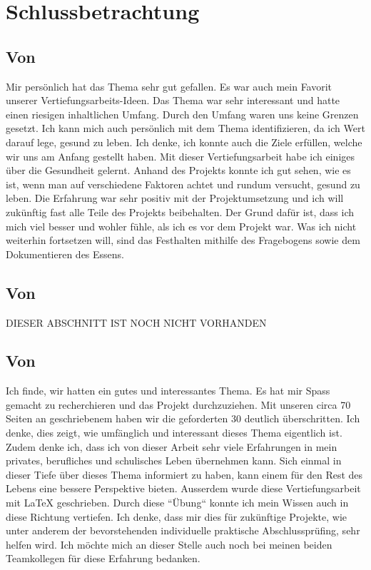 \chapter{Schlussbetrachtung}
\section{Von \bastian}
\authortoc{\bastian}{\sectionident}
Mir persönlich hat das Thema sehr gut gefallen. Es war auch mein Favorit unserer Vertiefungsarbeits-Ideen. Das Thema war sehr interessant und hatte einen riesigen inhaltlichen Umfang. Durch den Umfang waren uns keine Grenzen gesetzt. Ich kann mich auch persönlich mit dem Thema identifizieren, da ich Wert darauf lege, gesund zu leben. Ich denke, ich konnte auch die Ziele erfüllen, welche wir uns am Anfang gestellt haben. Mit dieser Vertiefungsarbeit habe ich einiges über die Gesundheit gelernt. Anhand des Projekts konnte ich gut sehen, wie es ist, wenn man auf verschiedene Faktoren achtet und rundum versucht, gesund zu leben. Die Erfahrung war sehr positiv mit der Projektumsetzung und ich will zukünftig fast alle Teile des Projekts beibehalten. Der Grund dafür ist, dass ich mich viel besser und wohler fühle, als ich es vor dem Projekt war. Was ich nicht weiterhin fortsetzen will, sind das Festhalten mithilfe des Fragebogens sowie dem Dokumentieren des Essens. 
\section{Von \dario}
\authortoc{\dario}{\sectionident}
DIESER ABSCHNITT IST NOCH NICHT VORHANDEN
\newline
\newline
\lipsum[4-8][32-64]
\section{Von \jonas}
\authortoc{\jonas}{\sectionident}
Ich finde, wir hatten ein gutes und interessantes Thema. Es hat mir Spass gemacht zu recherchieren und das Projekt durchzuziehen. Mit unseren circa 70 Seiten an geschriebenem haben wir die geforderten 30 deutlich überschritten. Ich denke, dies zeigt, wie umfänglich und interessant dieses Thema eigentlich ist.
\newline
\newline
Zudem denke ich, dass ich von dieser Arbeit sehr viele Erfahrungen in mein privates, berufliches und schulisches Leben übernehmen kann. Sich einmal in dieser Tiefe über dieses Thema informiert zu haben, kann einem für den Rest des Lebens eine bessere Perspektive bieten. Ausserdem wurde diese Vertiefungsarbeit mit LaTeX geschrieben. Durch diese “Übung“ konnte ich mein Wissen auch in diese Richtung vertiefen. Ich denke, dass mir dies für zukünftige Projekte, wie unter anderem der bevorstehenden individuelle praktische Abschlussprüfing, sehr helfen wird.
\newline
\newline
Ich möchte mich an dieser Stelle auch noch bei meinen beiden Teamkollegen für diese Erfahrung bedanken.